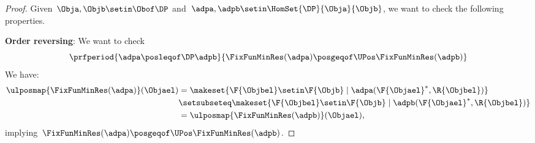 \begin{proof}
    Given~$\Obja,\Objb \setin \Obof\DP$ and~$\adpa,\adpb \setin \HomSet{\DP}{\Obja}{\Objb}$, we want to check the following properties.

    \textbf{Order reversing}:
    We want to check
    \begin{equation}
        \prfperiod{\adpa \posleqof\DP \adpb}{\FixFunMinRes(\adpa) \posgeqof\UPos \FixFunMinRes(\adpb)}
    \end{equation}
    We have:
    \begin{equation}
        \begin{aligned}
            \ulposmap{\FixFunMinRes(\adpa)}(\Objael) & =\makeset{\F{\Objbel} \setin \F{\Objb} \mid \adpa(\F{\Objael}^*, \R{\Objbel})} \\
                                                     & \setsubseteq \makeset{\F{\Objbel} \setin \F{\Objb} \mid \adpb(\F{\Objael}^*, \R{\Objbel})} \\
                                                     & = \ulposmap{\FixFunMinRes(\adpb)}(\Objael),
        \end{aligned}
    \end{equation}
    implying~$\FixFunMinRes(\adpa) \posgeqof\UPos \FixFunMinRes(\adpb)$.


\end{proof}
